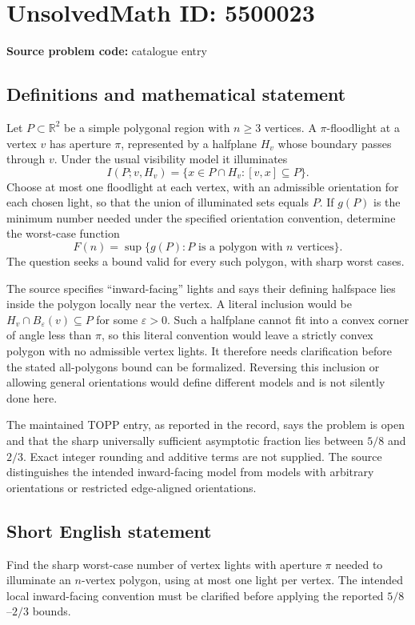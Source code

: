\documentclass[11pt]{article}
\begin{document}
\section*{UnsolvedMath ID: 5500023}
\textbf{Source problem code:} catalogue entry
\subsection{Definitions and mathematical statement}
Let $P\subset\mathbb R^2$ be a simple polygonal region with $n\geq3$ vertices. A $\pi$-floodlight at a vertex $v$ has aperture $\pi$, represented by a halfplane $H_v$ whose boundary passes through $v$. Under the usual visibility model it illuminates
\[
I(P;v,H_v)=\{x\in P\cap H_v:[v,x]\subseteq P\}.
\]
Choose at most one floodlight at each vertex, with an admissible orientation for each chosen light, so that the union of illuminated sets equals $P$. If $g(P)$ is the minimum number needed under the specified orientation convention, determine the worst-case function
\[
F(n)=\sup\{g(P):P\text{ is a polygon with }n\text{ vertices}\}.
\]
The question seeks a bound valid for every such polygon, with sharp worst cases.

The source specifies ``inward-facing'' lights and says their defining halfspace lies inside the polygon locally near the vertex. A literal inclusion would be $H_v\cap B_\varepsilon(v)\subseteq P$ for some $\varepsilon>0$. Such a halfplane cannot fit into a convex corner of angle less than $\pi$, so this literal convention would leave a strictly convex polygon with no admissible vertex lights. It therefore needs clarification before the stated all-polygons bound can be formalized. Reversing this inclusion or allowing general orientations would define different models and is not silently done here.

The maintained TOPP entry, as reported in the record, says the problem is open and that the sharp universally sufficient asymptotic fraction lies between $5/8$ and $2/3$. Exact integer rounding and additive terms are not supplied. The source distinguishes the intended inward-facing model from models with arbitrary orientations or restricted edge-aligned orientations.
\subsection{Short English statement}
Find the sharp worst-case number of vertex lights with aperture $\pi$ needed to illuminate an $n$-vertex polygon, using at most one light per vertex. The intended local inward-facing convention must be clarified before applying the reported $5/8$--$2/3$ bounds.
\end{document}
